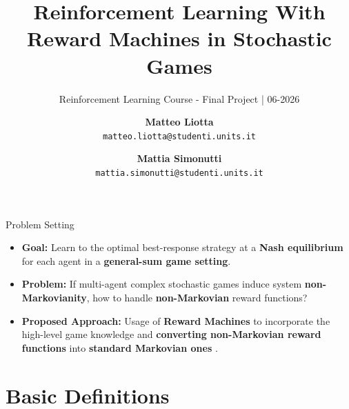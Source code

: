 \documentclass[10pt, aspectratio=169]{beamer}
\title{Reinforcement Learning With Reward Machines in Stochastic Games}
\subtitle{\small Reinforcement Learning Course - Final Project | 06-2026}
\author[M. Liotta \and M. Simonutti]{%
  \hspace{1cm} %
  \begin{tabular}{@{}c@{}}
    \textbf{Matteo Liotta} \\ 
    \footnotesize\texttt{matteo.liotta@studenti.units.it}
  \end{tabular}
  \and
  \hfill %
  \begin{tabular}{@{}c@{}}
    \textbf{Mattia Simonutti} \\ 
    \footnotesize\texttt{mattia.simonutti@studenti.units.it}
  \end{tabular}
  \hspace{1cm} %
}
\institute[UniTS]{%
  \centering
  University of Trieste \\
  \textit{Department of Mathematics and Geosciences}
}
\date[2026]{}
\newcommand{\evidenzia}[1]{\textcolor{verdeSalvia}{\textbf{#1}}}
\begin{document}
\frame{\titlepage}

\begin{frame}{Problem Setting}
    \begin{itemize}
        \item \textbf{Goal:} Learn to the optimal best-response strategy at a \evidenzia{Nash equilibrium} for each agent in a \evidenzia{general-sum game setting}.\\
    \end{itemize}
    \begin{itemize}
        \item \textbf{Problem:} If multi-agent complex stochastic games induce system \evidenzia{non-Markovianity}, how to handle \evidenzia{non-Markovian} reward functions?
        \item \textbf{Proposed Approach:} Usage of \evidenzia{Reward Machines} to incorporate the high-level game knowledge and \evidenzia{converting non-Markovian reward functions} into \evidenzia{standard Markovian ones} \cite{hu2023reinforcement}.
    \end{itemize}
\end{frame}

\section{Basic Definitions}
\end{document}
